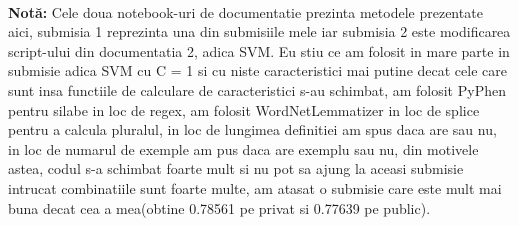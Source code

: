 \documentclass{article}
\begin{document}
\paragraph{} \textbf{Notă:} Cele doua notebook-uri de documentatie prezinta metodele prezentate aici, submisia 1 reprezinta una din submisiile mele iar submisia 2 este modificarea script-ului din documentatia 2, adica SVM. Eu stiu ce am folosit in mare parte in submisie adica SVM cu C = 1 si cu niste caracteristici mai putine decat cele care sunt insa functiile de calculare de caracteristici s-au schimbat, am folosit PyPhen pentru silabe in loc de regex, am folosit WordNetLemmatizer in loc de splice pentru a calcula pluralul, in loc de lungimea definitiei am spus daca are sau nu, in loc de numarul de exemple am pus daca are exemplu sau nu, din motivele astea, codul s-a schimbat foarte mult si nu pot sa ajung la aceasi submisie intrucat combinatiile sunt foarte multe, am atasat o submisie care este mult mai buna decat cea a mea(obtine 0.78561 pe privat si 0.77639 pe public).
 
\end{document}
